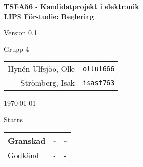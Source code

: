 \documentclass[11pt]{article}
\begin{document}
\begin{titlepage}
\begin{center}

{\Large\bfseries TSEA56 - Kandidatprojekt i elektronik \\ LIPS Förstudie: Reglering}

\vspace{5em}

Version 0.1

\vspace{5em}
Grupp 4 \\
\begin{tabular}{rl}
Hynén Ulfsjöö, Olle&\verb+ollul666+
\\
Strömberg, Isak&\verb+isast763+
\\
\end{tabular}

\vspace{5em}
\today

\vspace{16em}
Status
\begin{longtable}{|l|l|l|} \hline

Granskad & - & - \\ \hline
Godkänd & - & - \\ \hline
 
\end{longtable}

\end{center}
\end{titlepage}
\end{document}
